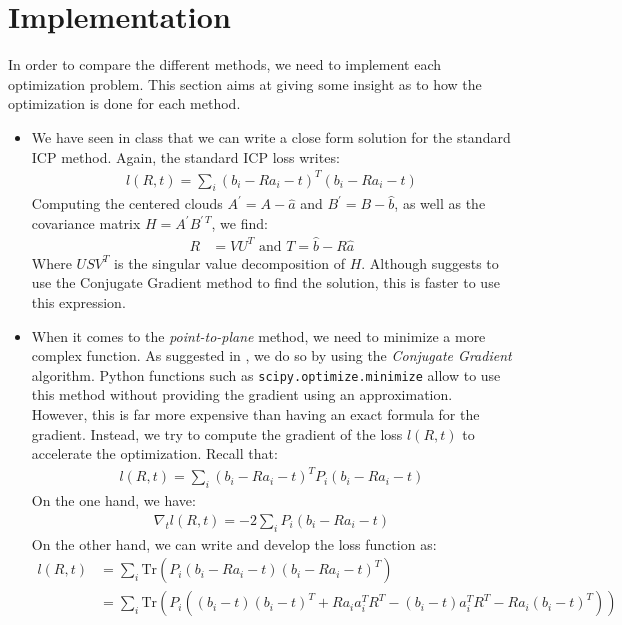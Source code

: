 \documentclass[11pt,letterpaper,leqno]{article}
\begin{document}
\section{Implementation}
In order to compare the different methods, we need to implement each optimization problem. This section aims at giving some insight as to how the optimization is done for each method.
\begin{itemize}
    \item We have seen in class that we can write a close form solution for the standard ICP method. Again, the standard ICP loss writes:
    \begin{align*}
        l(R,t) = \sum_i  (b_i - R a_i -t)^T (b_i - R a_i -t)
    \end{align*}
    Computing the centered clouds $A^\prime = A - \hat{a}$ and $B^\prime = B - \hat{b}$, as well as the covariance matrix $H = A^\prime B^{\prime \, T}$, we find:
    \begin{align}
        R &= VU^T \text{ and } T = \hat{b} - R \hat{a}
    \end{align}
    Where $USV^T$ is the singular value decomposition of $H$. Although \cite{generalized-icp} suggests to use the Conjugate Gradient method to find the solution, this is faster to use this expression.
    \item When it comes to the \textit{point-to-plane} method, we need to minimize a more complex function. As suggested in \cite{generalized-icp}, we do so by using the \textit{Conjugate Gradient} algorithm. Python functions such as \texttt{scipy.optimize.minimize} allow to use this method without providing the gradient using an approximation. However, this is far more expensive than having an exact formula for the gradient. Instead, we try to compute the gradient of the loss $l(R,t)$ to accelerate the optimization. Recall that:
    \begin{align*}
        l(R,t) = \sum_i (b_i - R a_i -t)^T P_i (b_i - R a_i -t)
    \end{align*}
    On the one hand, we have:
    \begin{align}
        \nabla_t l(R,t) = - 2 \sum_i P_i (b_i - R a_i -t)
    \end{align}
    On the other hand, we can write and develop the loss function as:
    \begin{align*}
        l(R,t) &= \sum_i \text{Tr}(P_i (b_i - R a_i - t) (b_i - R a_i - t)^T) \\
        &= \sum_i \text{Tr}\left(P_i \left( (b_i - t)(b_i - t)^T + R a_i a_i^T R^T - (b_i-t)a_i^T R^T - R a_i(b_i-t)^T\right) \right)\\

\end{align*}
\end{itemize}
\end{document}
